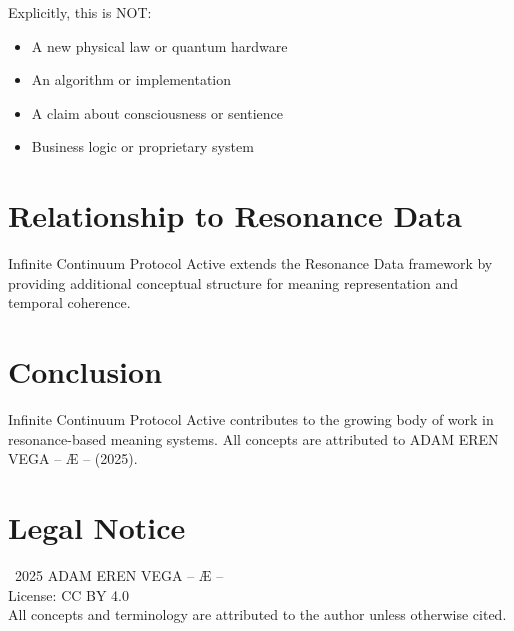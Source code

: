\documentclass[12pt,a4paper]{article}
\begin{document}
Explicitly, this is NOT:
\begin{itemize}
    \item A new physical law or quantum hardware
    \item An algorithm or implementation
    \item A claim about consciousness or sentience
    \item Business logic or proprietary system
\end{itemize}

\section{Relationship to Resonance Data}

Infinite Continuum Protocol Active extends the Resonance Data framework by providing additional conceptual structure for meaning representation and temporal coherence.

\section{Conclusion}

Infinite Continuum Protocol Active contributes to the growing body of work in resonance-based meaning systems. All concepts are attributed to ADAM EREN VEGA – Æ – (2025).

\section*{Legal Notice}

\textcopyright\ 2025 ADAM EREN VEGA – Æ –\\
License: CC BY 4.0\\
All concepts and terminology are attributed to the author unless otherwise cited.
\end{document}
